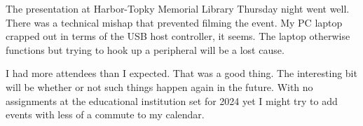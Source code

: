 The presentation at Harbor-Topky Memorial Library Thursday night went
well. There was a technical mishap that prevented filming the event. My
PC laptop crapped out in terms of the USB host controller, it seems. The
laptop otherwise functions but trying to hook up a peripheral will be a
lost cause.

I had more attendees than I expected. That was a good thing. The
interesting bit will be whether or not such things happen again in the
future. With no assignments at the educational institution set for 2024
yet I might try to add events with less of a commute to my calendar.
